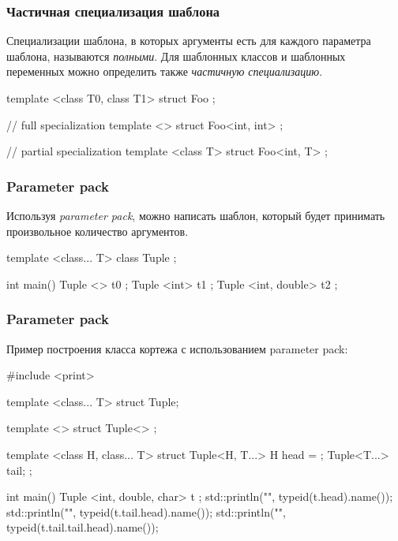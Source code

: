 \documentclass[compress, 8pt, aspectratio=169]{beamer}
\begin{document}
  \begin{frame}[fragile]

    \frametitle{Частичная специализация шаблона}

    Специализации шаблона, в которых аргументы есть для
    каждого параметра шаблона, называются \textit{полными}.
    Для шаблонных классов и шаблонных переменных можно
    определить также \textit{частичную специализацию}\footnotemark{}.


    \begin{myinplacelisting}[minted language=cpp]
template <class T0, class T1>
struct Foo {};

// full specialization
template <>
struct Foo<int, int> {};

// partial specialization
template <class T>
struct Foo<int, T> {};
    \end{myinplacelisting}

  \end{frame}

  \begin{frame}[fragile]

    \frametitle{Parameter pack}

    Используя \textit{parameter pack}\footnotemark{},
    можно написать шаблон, который будет принимать произвольное
    количество аргументов.

    \begin{myinplacelisting}[minted language=cpp]
template <class... T>
class Tuple {};

int main() {
    Tuple <> t0 {};
    Tuple <int> t1 {};
    Tuple <int, double> t2 {};
}
    \end{myinplacelisting}

  \end{frame}

  \begin{frame}[fragile]

    \frametitle{Parameter pack}

    Пример построения класса кортежа с использованием
    parameter pack:

    \begin{myinplacelisting}[minted language=cpp]
#include <print>

template <class... T>
struct Tuple;

template <>
struct Tuple<> {};

template <class H, class... T>
struct Tuple<H, T...> {
    H head = {};
    Tuple<T...> tail;
};

int main() {
    Tuple <int, double, char> t {};
    std::println("{}", typeid(t.head).name());
    std::println("{}", typeid(t.tail.head).name());
    std::println("{}", typeid(t.tail.tail.head).name());
}
    \end{myinplacelisting}

  \end{frame}
\end{document}
